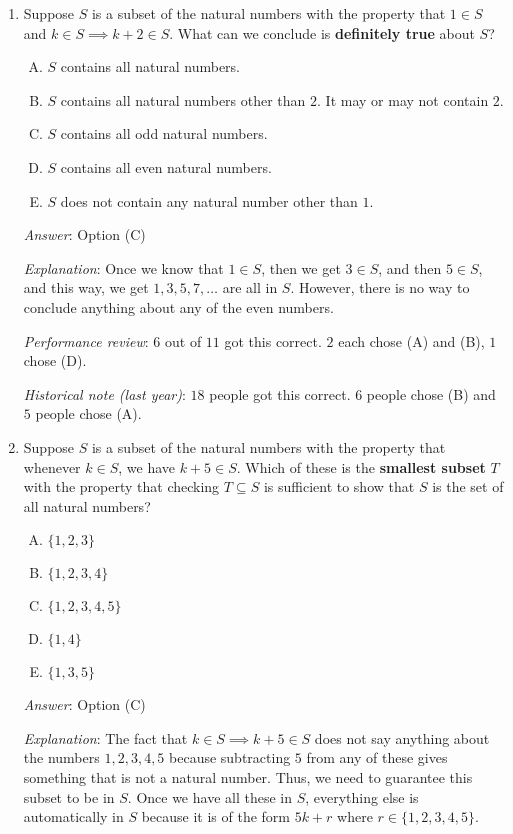 \documentclass[10pt]{amsart}
\begin{document}
\begin{enumerate}
\item Suppose $S$ is a subset of the natural numbers with the property
  that $1 \in S$ and $k \in S \implies k + 2 \in S$. What can we
  conclude is {\bf definitely true} about $S$?

  \begin{enumerate}[(A)]
  \item $S$ contains all natural numbers.
  \item $S$ contains all natural numbers other than $2$. It may or may
    not contain $2$.
  \item $S$ contains all odd natural numbers.
  \item $S$ contains all even natural numbers.
  \item $S$ does not contain any natural number other than $1$.
  \end{enumerate}

  {\em Answer}: Option (C)

  {\em Explanation}: Once we know that $1 \in S$, then we get $3 \in
  S$, and then $5 \in S$, and this way, we get $1,3,5,7,\dots$ are all
  in $S$. However, there is no way to conclude anything about any of
  the even numbers.

  {\em Performance review}: $6$ out of $11$ got this correct. $2$ each
  chose (A) and (B), $1$ chose (D).

  {\em Historical note (last year)}: $18$ people got this correct. $6$
  people chose (B) and $5$ people chose (A).
\item Suppose $S$ is a subset of the natural numbers with the property
  that whenever $k \in S$, we have $k + 5 \in S$. Which of these is
  the {\bf smallest subset} $T$ with the property that checking $T
  \subseteq S$ is sufficient to show that $S$ is the set of all
  natural numbers?

  \begin{enumerate}[(A)]
  \item $\{ 1,2,3 \}$
  \item $\{ 1,2,3,4 \}$
  \item $\{ 1,2,3,4,5 \}$
  \item $\{ 1,4 \}$
  \item $\{ 1,3,5 \}$
  \end{enumerate}

  {\em Answer}: Option (C)

  {\em Explanation}: The fact that $k \in S \implies k + 5 \in S$ does
  not say anything about the numbers $1,2,3,4,5$ because subtracting
  $5$ from any of these gives something that is not a natural
  number. Thus, we need to guarantee this subset to be in $S$. Once we
  have all these in $S$, everything else is automatically in $S$
  because it is of the form $5k + r$ where $r \in \{ 1,2,3,4,5 \}$.


\end{enumerate}
\end{document}
